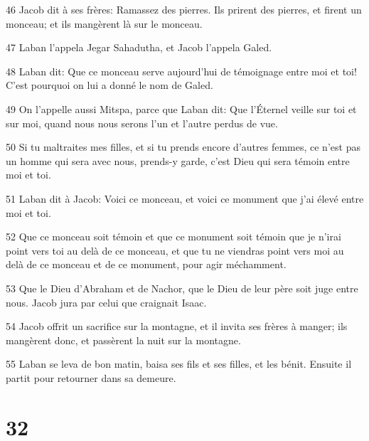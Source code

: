 \par 46 Jacob dit à ses frères: Ramassez des pierres. Ils prirent des pierres, et firent un monceau; et ils mangèrent là sur le monceau.
\par 47 Laban l'appela Jegar Sahadutha, et Jacob l'appela Galed.
\par 48 Laban dit: Que ce monceau serve aujourd'hui de témoignage entre moi et toi! C'est pourquoi on lui a donné le nom de Galed.
\par 49 On l'appelle aussi Mitspa, parce que Laban dit: Que l'Éternel veille sur toi et sur moi, quand nous nous serons l'un et l'autre perdus de vue.
\par 50 Si tu maltraites mes filles, et si tu prends encore d'autres femmes, ce n'est pas un homme qui sera avec nous, prends-y garde, c'est Dieu qui sera témoin entre moi et toi.
\par 51 Laban dit à Jacob: Voici ce monceau, et voici ce monument que j'ai élevé entre moi et toi.
\par 52 Que ce monceau soit témoin et que ce monument soit témoin que je n'irai point vers toi au delà de ce monceau, et que tu ne viendras point vers moi au delà de ce monceau et de ce monument, pour agir méchamment.
\par 53 Que le Dieu d'Abraham et de Nachor, que le Dieu de leur père soit juge entre nous. Jacob jura par celui que craignait Isaac.
\par 54 Jacob offrit un sacrifice sur la montagne, et il invita ses frères à manger; ils mangèrent donc, et passèrent la nuit sur la montagne.
\par 55 Laban se leva de bon matin, baisa ses fils et ses filles, et les bénit. Ensuite il partit pour retourner dans sa demeure.

\chapter{32}

